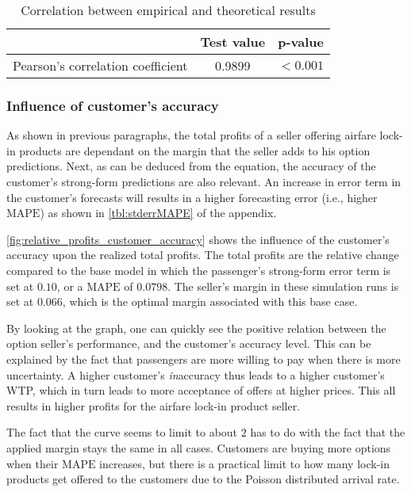 \begin{table}
\centering
\begin{tabular}{l c c}
\toprule
~  &  Test value  &  p-value  \\
\midrule
Pearson's correlation coefficient   &  0.9899  &  $< 0.001$ \\
\bottomrule
\end{tabular}
\caption{Correlation between empirical and theoretical results}
\label{tbl:pearson_theory_empirical}
\end{table}



\subsubsection{Influence of customer's accuracy}
As shown in previous paragraphs, the total profits of a seller offering airfare lock-in products are dependant on the margin that the seller adds to his option predictions. Next, as can be deduced from the equation, the accuracy of the customer's strong-form predictions are also relevant. An increase in error term in the customer's forecasts will results in a higher forecasting error (i.e., higher $\mbox{MAPE}$) as shown in \autoref{tbl:stderrMAPE} of the appendix.

\autoref{fig:relative_profits_customer_accuracy} shows the influence of the customer's accuracy upon the realized total profits. The total profits are the relative change compared to the base model in which the passenger's strong-form error term is set at $0.10$, or a $\mbox{MAPE}$ of $0.0798$. The seller's margin in these simulation runs is set at $0.066$, which is the optimal margin associated with this base case.


By looking at the graph, one can quickly see the positive relation between the option seller's performance, and the customer's accuracy level. This can be explained by the fact that passengers are more willing to pay when there is more uncertainty. A higher customer's \emph{in}accuracy thus leads to a higher customer's WTP, which in turn leads to more acceptance of offers at higher prices. This all results in higher profits for the airfare lock-in product seller.

The fact that the curve seems to limit to about $2$ has to do with the fact that the applied margin stays the same in all cases. Customers are buying more options when their $\mbox{MAPE}$ increases, but there is a practical limit to how many lock-in products get offered to the customers due to the Poisson distributed arrival rate.

